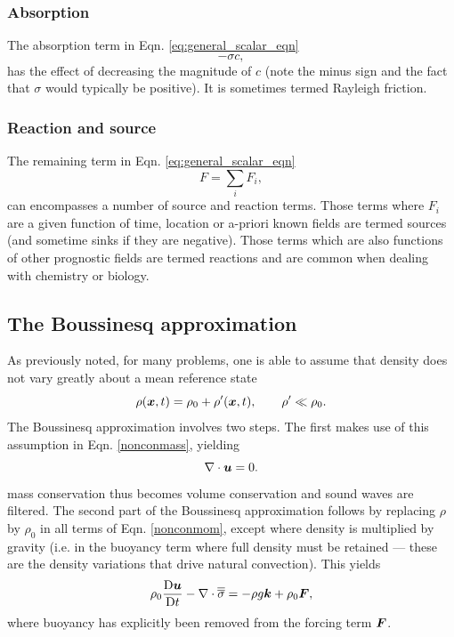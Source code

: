 \subsubsection{Absorption}
The absorption term in Eqn. \ref{eq:general_scalar_eqn}
\begin{equation}\label{eq:scalar_absorption}
-\sigma c,
\end{equation}
has the effect of decreasing the magnitude of $c$ (note the minus sign and the fact that $\sigma$ would typically be positive). It is sometimes termed Rayleigh friction.

\subsubsection{Reaction and source}
The remaining term in Eqn. \ref{eq:general_scalar_eqn}
\begin{equation}\label{eq:scalar_source}
F = \sum_i F_i,
\end{equation}
can encompasses a number of source and reaction terms. Those terms where $F_i$ are a given function of time, location or a-priori known fields are termed sources (and sometime sinks if they are negative). Those terms which are also functions of other prognostic fields are termed reactions and are common when dealing with chemistry or biology.




\subsection{The Boussinesq approximation} \label{sect:boussinesq_approximation}
As previously noted, for many problems, one is able to assume that density does not vary greatly about a mean reference state
\begin{equation}\label{eq:densref}
\rho({\mbox{\boldmath$x$}},t) = \rho_0 + \rho'({\mbox{\boldmath$x$}},t),\qquad \rho'\ll\rho_0.
\end{equation}
The Boussinesq approximation involves two steps. The first makes use of this assumption in Eqn. \ref{nonconmass}, yielding
\begin{equation}\label{eq:divfree}
\nabla\cdot{\mbox{\boldmath$u$}}=0.
\end{equation}
mass conservation thus becomes volume conservation and sound waves are filtered. The second part of the Boussinesq approximation follows by replacing $\rho$ by $\rho_0$ in all terms of Eqn. \ref{nonconmom}, except where density is multiplied by gravity (i.e. in the buoyancy term where full density must be retained --- these are the density variations that drive natural convection). This yields
\begin{equation}
\rho_0\frac{\mathrm{D}{\mbox{\boldmath$u$}}}{\mathrm{D} t} -\nabla\cdot\overline{\overline{\sigma}} = -\rho g{\mbox{\boldmath$k$}} +
\rho_0{\mbox{\boldmath$F$}},
\end{equation}
where buoyancy has explicitly been removed from the forcing term ${\mbox{\boldmath$F$}}$.

